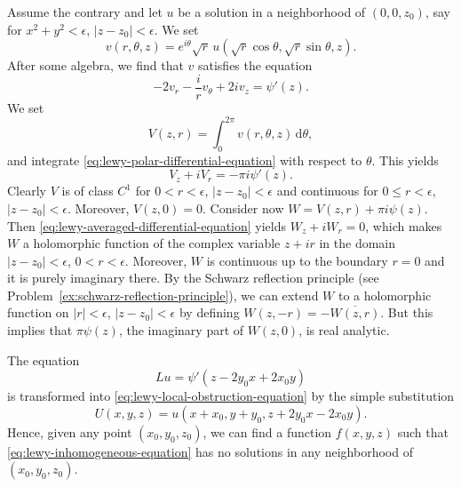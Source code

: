 \begin{Proof}
Assume the contrary and let $u$ be a solution in a neighborhood of $(0,0,z_0)$, say for $x^2+y^2<\epsilon$, $|z-z_0|<\epsilon$. We set
\begin{equation}\label{eq:lewy-polar-transformed-function}
v(r,\theta,z)=e^{i\theta}\sqrt r\,u(\sqrt r\cos\theta,\sqrt r\sin\theta,z).
\end{equation}
After some algebra, we find that $v$ satisfies the equation
\begin{equation}\label{eq:lewy-polar-differential-equation}
-2v_r-\dfrac irv_\theta+2iv_z=\psi'(z).
\end{equation}
We set
\begin{equation}\label{eq:lewy-angular-average}
V(z,r)=\int_0^{2\pi}v(r,\theta,z)\,\mathrm{d}\theta,
\end{equation}
and integrate \eqref{eq:lewy-polar-differential-equation} with respect to $\theta$. This yields
\begin{equation}\label{eq:lewy-averaged-differential-equation}
V_z+iV_r=-\pi i\psi'(z).
\end{equation}
Clearly $V$ is of class $C^1$ for $0<r<\epsilon$, $|z-z_0|<\epsilon$ and continuous for $0\leq r<\epsilon$, $|z-z_0|<\epsilon$. Moreover, $V(z,0)=0$. Consider now $W=V(z,r)+\pi i\psi(z)$. Then \eqref{eq:lewy-averaged-differential-equation} yields $W_z+iW_r=0$, which makes $W$ a holomorphic function of the complex variable $z+ir$ in the domain $|z-z_0|<\epsilon$, $0<r<\epsilon$. Moreover, $W$ is continuous up to the boundary $r=0$ and it is purely imaginary there. By the Schwarz reflection principle (see Problem~\ref{ex:schwarz-reflection-principle}), we can extend $W$ to a holomorphic function on $|r|<\epsilon$, $|z-z_0|<\epsilon$ by defining $W(z,-r)=-\overline{W(z,r)}$. But this implies that $\pi\psi(z)$, the imaginary part of $W(z,0)$, is real analytic.
\end{Proof}

The equation
\begin{equation}\label{eq:lewy-shifted-forcing}
Lu=\psi'(z-2y_0x+2x_0y)
\end{equation}
is transformed into \eqref{eq:lewy-local-obstruction-equation} by the simple substitution
\begin{equation}\label{eq:lewy-coordinate-translation}
U(x,y,z)=u(x+x_0,y+y_0,z+2y_0x-2x_0y).
\end{equation}
Hence, given any point $(x_0,y_0,z_0)$, we can find a function $f(x,y,z)$ such that \eqref{eq:lewy-inhomogeneous-equation} has no solutions in any neighborhood of $(x_0,y_0,z_0)$.

